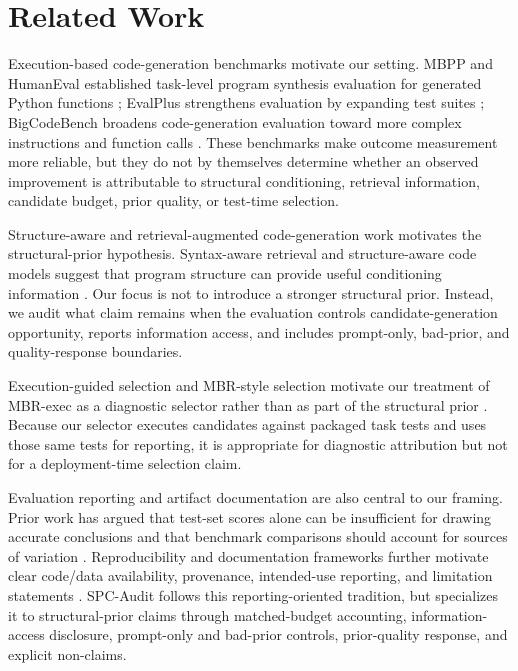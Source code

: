 \documentclass{article}
\begin{document}
\section{Related Work}
Execution-based code-generation benchmarks motivate our setting. MBPP and HumanEval established task-level program synthesis evaluation for generated Python functions \citep{austin2021program,chen2021evaluating}; EvalPlus strengthens evaluation by expanding test suites \citep{liu2023evalplus}; BigCodeBench broadens code-generation evaluation toward more complex instructions and function calls \citep{zhuo2024bigcodebench}. These benchmarks make outcome measurement more reliable, but they do not by themselves determine whether an observed improvement is attributable to structural conditioning, retrieval information, candidate budget, prior quality, or test-time selection.

Structure-aware and retrieval-augmented code-generation work motivates the structural-prior hypothesis. Syntax-aware retrieval and structure-aware code models suggest that program structure can provide useful conditioning information \citep{zhang2023syntax,tipirneni2022structcoder}. Our focus is not to introduce a stronger structural prior. Instead, we audit what claim remains when the evaluation controls candidate-generation opportunity, reports information access, and includes prompt-only, bad-prior, and quality-response boundaries.

Execution-guided selection and MBR-style selection motivate our treatment of MBR-exec as a diagnostic selector rather than as part of the structural prior \citep{shi2022execution,vamvas2024linear}. Because our selector executes candidates against packaged task tests and uses those same tests for reporting, it is appropriate for diagnostic attribution but not for a deployment-time selection claim.

Evaluation reporting and artifact documentation are also central to our framing. Prior work has argued that test-set scores alone can be insufficient for drawing accurate conclusions and that benchmark comparisons should account for sources of variation \citep{dodge2019show,bouthillier2021accounting}. Reproducibility and documentation frameworks further motivate clear code/data availability, provenance, intended-use reporting, and limitation statements \citep{pineau2021improving,gebru2021datasheets,mitchell2019model,bender2018data}. SPC-Audit follows this reporting-oriented tradition, but specializes it to structural-prior claims through matched-budget accounting, information-access disclosure, prompt-only and bad-prior controls, prior-quality response, and explicit non-claims.
\end{document}
